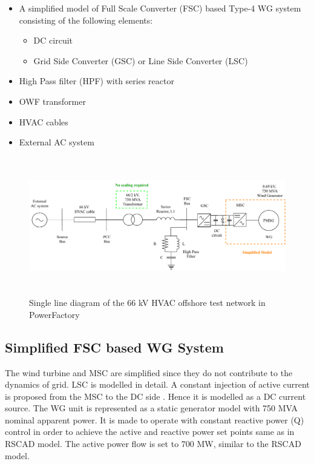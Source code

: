 \begin{itemize}
    \item A simplified model of Full Scale Converter (\gls{FSC}) based Type-4 \gls{WG} system consisting of the following elements:
    \begin{itemize}
        \item \gls{DC} circuit
        \item Grid Side Converter (\gls{GSC}) or Line Side Converter (\gls{LSC})
    \end{itemize}
    \item High Pass filter (\gls{HPF}) with series reactor
    \item \gls{OWF} transformer
    \item \gls{HVAC} cables  
    \item External \gls{AC} system
\end{itemize}

\begin{figure}[H]
    \includegraphics[height = 6cm,width = \textwidth]{Diagrams/Chapter_3/WT1_AC_PFD.pdf}
    \caption{Single line diagram of the 66 kV HVAC offshore test network in PowerFactory}
    \label{fig:WT1_Model_PFD_comp}
\end{figure}

\subsection{Simplified FSC based WG System}
The wind turbine and \gls{MSC} are simplified since they do not contribute to the dynamics of grid. \gls{LSC} is modelled in detail. A constant injection of active current is proposed from the \gls{MSC} to the \gls{DC} side \cite{korai_dynamic_2019}. Hence it is modelled as a \gls{DC} current source. The \gls{WG} unit is represented as a static generator model with 750 MVA nominal apparent power. It is made to operate with constant reactive power (Q) control in order to achieve the active and reactive power set points same as in RSCAD model. The active power flow is set to 700 MW, similar to the RSCAD model.

